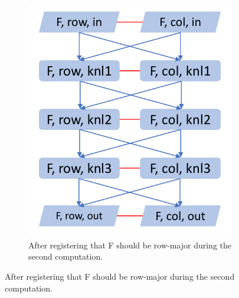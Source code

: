 \documentclass[sigconf,review=true]{acmart}
\begin{document}
\begin{figure}
\begin{subfigure}[t]{0.2\textwidth}
		\includegraphics[page=2,width=\textwidth]{ModelProgression.pdf}
		\caption{After registering that F should be row-major during the second computation.}
		\label{graphModel:2}
	\end{subfigure}


\end{figure}
\end{document}

